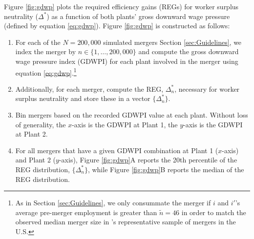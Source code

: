 \documentclass[12pt]{article}
\newcommand{\redSM}{\textcolor[rgb]{0.89,0.08,0.24}}    %
\theoremstyle{prop}
\begin{document}
 
Figure \ref{fig:gdwp} plots the required efficiency gains (REGs) for worker surplus neutrality ($\Delta^*$) as a function of both plants' gross downward wage pressure (defined by equation \ref{eq:gdwp}).  
Figure \ref{fig:gdwp} is constructed as follows:\vspace*{-.2cm}
{\small\begin{enumerate}
	\item For each of the $N=200,000$ simulated mergers Section \ref{sec:Guidelines}, we index the merger by $n\in\{1,\ldots,200,000\}$ and compute the gross downward wage pressure index (GDWPI) for each plant involved in the merger using equation \eqref{eq:gdwp}.\footnote{
            As in  Section \ref{sec:Guidelines}, we only  consummate the merger if $i$ and $i'$'s average pre-merger employment is greater than $\tilde{n}=46$ in order to match the observed median merger size in \citet{Arnold}'s representative sample of mergers in the U.S. }
 \vspace*{-.2cm}
	\item Additionally, for each merger,  compute the REG, $\Delta^*_n$, necessary for worker surplus neutrality and store these in a vector $\{\Delta_n^\ast\}$.\vspace*{-.2cm}
	\item Bin mergers based on the recorded GDWPI value at each plant. Without loss of generality, the $x$-axis is the GDWPI at Plant 1, the $y$-axis is the GDWPI at Plant 2.\vspace*{-.2cm}
	\item For all mergers that have a given GDWPI combination at Plant 1 ($x$-axis) and Plant 2 ($y$-axis), Figure \ref{fig:gdwp}A reports the 20th percentile of the  REG distribution, $\{\Delta_n^\ast\}$, while  Figure \ref{fig:gdwp}B reports the median of the  REG distribution.\vspace*{-.2cm}
\end{enumerate}}

\end{document}
